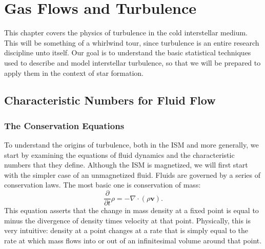 \chapter{Gas Flows and Turbulence}
\label{ch:turbulence}


This chapter covers the physics of turbulence in the cold interstellar medium. This will be something of a whirlwind tour, since turbulence is an entire research discipline unto itself. Our goal is to understand the basic statistical techniques used to describe and model interstellar turbulence, so that we will be prepared to apply them in the context of star formation.

\section{Characteristic Numbers for Fluid Flow}

\subsection{The Conservation Equations}

To understand the origins of turbulence, both in the ISM and more generally, we start by examining the equations of fluid dynamics and the characteristic numbers that they define. Although the ISM is magnetized, we will first start with the simpler case of an unmagnetized fluid. Fluids are governed by a series of conservation laws. The most basic one is conservation of mass:
\begin{equation}
\frac{\partial}{\partial t} \rho = -\nabla \cdot (\rho\mathbf{v}).
\end{equation}
This equation asserts that the change in mass density at a fixed point is equal to minus the divergence of density times velocity at that point. Physically, this is very intuitive: density at a point changes at a rate that is simply equal to the rate at which mass flows into or out of an infinitesimal volume around that point.

